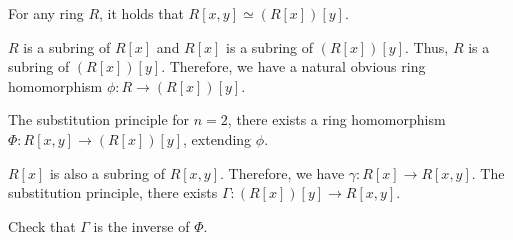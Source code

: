 \begin{thm}
	For any ring $R$, it holds that $R[x, y] \simeq (R[x])[y]$.
\end{thm}

\begin{dem}
	$R$ is a subring of $R[x]$ and $R[x]$ is a subring of $(R[x])[y]$. Thus, $R$ is a subring of $(R[x])[y]$. Therefore, we have a natural obvious ring homomorphism  $\phi: R \to (R[x])[y]$.

	The substitution principle for $n = 2$, there exists a ring homomorphism  $\Phi: R[x, y] \to (R[x])[y]$, extending  $\phi$.

	$R[x]$ is also a subring of $R[x, y]$. Therefore, we have  $\gamma: R[x] \to R[x, y]$.
	The substitution principle, there exists $\Gamma: (R[x])[y] \to R[x, y]$.

	Check that $\Gamma$ is the inverse of $\Phi$.
\end{dem}
